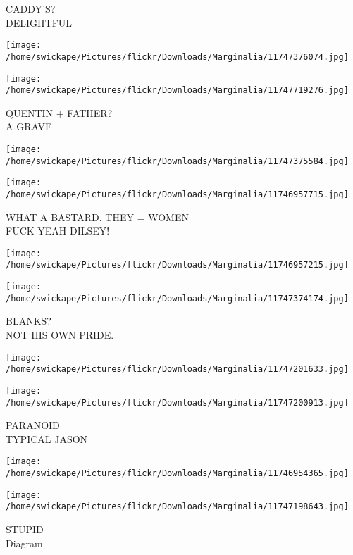 \documentclass[10pt,letterpaper]{article}
\begin{document}
CADDY'S?\\
DELIGHTFUL\\
\pagebreak

\texttt{[image: /home/swickape/Pictures/flickr/Downloads/Marginalia/11747376074.jpg]}

\vspace{0.25in}
\texttt{[image: /home/swickape/Pictures/flickr/Downloads/Marginalia/11747719276.jpg]}

QUENTIN + FATHER?\\
A GRAVE\\
\pagebreak

\texttt{[image: /home/swickape/Pictures/flickr/Downloads/Marginalia/11747375584.jpg]}

\vspace{0.25in}
\texttt{[image: /home/swickape/Pictures/flickr/Downloads/Marginalia/11746957715.jpg]}

WHAT A BASTARD.  THEY = WOMEN\\
FUCK YEAH DILSEY!\\
\pagebreak

\texttt{[image: /home/swickape/Pictures/flickr/Downloads/Marginalia/11746957215.jpg]}

\vspace{0.25in}
\texttt{[image: /home/swickape/Pictures/flickr/Downloads/Marginalia/11747374174.jpg]}

BLANKS?\\
NOT HIS OWN PRIDE.\\
\pagebreak

\texttt{[image: /home/swickape/Pictures/flickr/Downloads/Marginalia/11747201633.jpg]}

\vspace{0.25in}
\texttt{[image: /home/swickape/Pictures/flickr/Downloads/Marginalia/11747200913.jpg]}

PARANOID\\
TYPICAL JASON\\
\pagebreak

\texttt{[image: /home/swickape/Pictures/flickr/Downloads/Marginalia/11746954365.jpg]}

\vspace{0.25in}
\texttt{[image: /home/swickape/Pictures/flickr/Downloads/Marginalia/11747198643.jpg]}

STUPID\\
Diagram\\
\pagebreak
\end{document}
